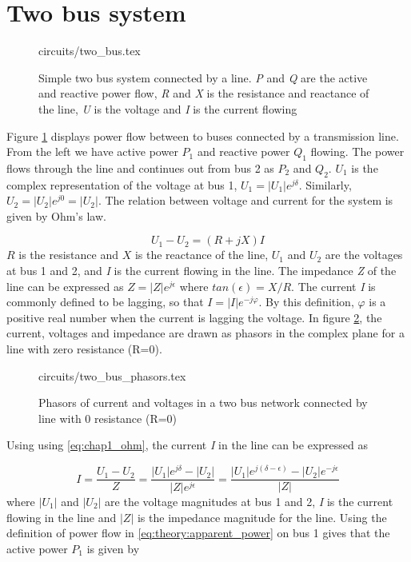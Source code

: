 \documentclass[class=book, crop=false]{standalone}
\begin{document}
\section{Two bus system} 

\begin{figure}[ht!]
    \center
    {circuits/two_bus.tex}
    \caption[size = 9]
    {Simple two bus system connected by a line. \textit{P} and \textit{Q} are the active and reactive power flow, \textit{R} and \textit{X} is the resistance and reactance of the line, \textit{U} is the voltage and \textit{I} is the current flowing}    \label{fig:theory:two_bus}
\end{figure}

Figure \ref{fig:theory:two_bus} displays power flow between to buses connected by a transmission line. From the left we have active power $P_{1}$ and reactive power $Q_{1}$ flowing. The power flows through the line and continues out from bus 2 as $P_{2}$ and $Q_{2}$. $U_{1}$ is the complex representation of the voltage at bus 1, $U_{1} = |U_{1}|e^{j\delta}$. Similarly, $U_{2} = |U_{2}|e^{j0} = |U_{2}|$. The relation between voltage and current for the system is given by Ohm's law.

\begin{equation}\label{eq:chap1_ohm}
    U_{1} - U_{2} = (R + jX)I
\end{equation}
$R$ is the resistance and $X$ is the reactance of the line, $U_{1}$ and $U_{2}$ are the voltages at bus 1 and 2, and \textit{I} is the current flowing in the line. The impedance \textit{Z} of the line can be expressed as $Z = |Z|e^{j\epsilon}$ where $tan (\epsilon) = X/R$. The current \textit{I} is commonly defined to be lagging, so that $I = |I|e^{-j\varphi}$. By this definition, $\varphi$ is a positive real number when the current is lagging the voltage. In figure \ref{fig:theory:two_bus_phasor}, the current, voltages and impedance are drawn as phasors in the complex plane for a line with zero resistance (R=0).


\begin{figure}[ht!]
    \center
    {circuits/two_bus_phasors.tex}
    \caption[size = 9]{Phasors of current and voltages in a two bus network connected by line with 0 resistance (R=0)}
    \label{fig:theory:two_bus_phasor}
\end{figure}

Using using \eqref{eq:chap1_ohm}, the current \textit{I} in the line can be expressed as

\begin{equation}\label{eq:two_port_current}
    I  = \frac{U_{1} - U_{2}}{Z}
    = \frac{|U_{1}|e^{j\delta} - |U_{2}|}{|Z|e^{j\epsilon}}
    = \frac{|U_{1}|e^{j(\delta- \epsilon)} - |U_{2}|e^{-j\epsilon}}{|Z|}
\end{equation}
where $|U_{1}|$ and $|U_{2}|$ are the voltage magnitudes at bus 1 and 2, \textit{I} is the current flowing in the line and $|Z|$ is the impedance magnitude for the line. Using the definition of power flow in \eqref{eq:theory:apparent_power} on bus 1 gives that the active power $P_{1}$ is given by
\end{document}
